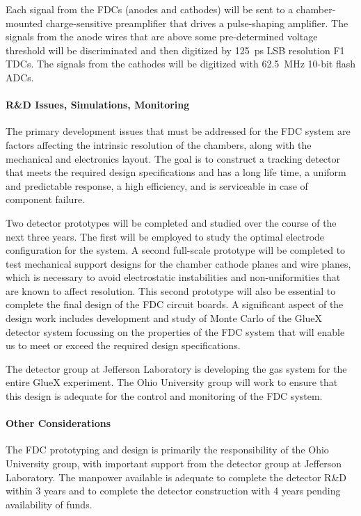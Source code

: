 \documentclass[11pt]{article}
\begin{document}
Each signal from the FDCs (anodes and cathodes) will be sent to a
chamber-mounted charge-sensitive preamplifier that drives a pulse-shaping 
amplifier. The signals from the anode wires that are above some 
pre-determined voltage threshold will be discriminated and then digitized 
by 125~ps LSB resolution F1 TDCs.  The signals from the cathodes will be digitized with 
62.5~MHz 10-bit flash ADCs.

\paragraph{R\&D Issues, Simulations, Monitoring}

The primary development issues that must be addressed for the FDC system
are factors affecting the intrinsic resolution of the chambers, along with 
the mechanical and electronics layout.  The goal is to construct a tracking 
detector that meets the required design specifications and has a long life 
time, a uniform and predictable response, a high efficiency, and is 
serviceable in case of component failure.

Two detector prototypes will be completed and studied over the course
of the next three years.  The first will be employed to study the optimal 
electrode configuration for the system.  A second full-scale prototype
will be completed to test mechanical support designs for the chamber 
cathode planes and wire planes, which is necessary to avoid electrostatic 
instabilities and non-uniformities that are known to affect resolution. 
This second prototype will also be essential to complete the final design 
of the FDC circuit boards.  A significant aspect of the design work includes 
development and study of Monte Carlo of the GlueX detector system focussing 
on the properties of the FDC system that will enable us to meet or exceed 
the required design specifications.

The detector group at Jefferson Laboratory is developing the gas system
for the entire GlueX experiment.  The Ohio University group will work
to ensure that this design is adequate for the control and monitoring
of the FDC system.

\paragraph{Other Considerations}

The  FDC prototyping and design is primarily the responsibility of
the Ohio University group, with important support from the detector
group at Jefferson Laboratory.  The manpower available is adequate
to complete the detector R\&D within 3 years and to complete the
detector construction with 4 years pending availability of funds.
\end{document}
